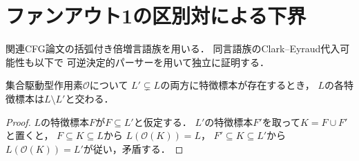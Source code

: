 \section{ファンアウト1の区別対による下界}
\label{app:fanout-one-lower}
関連CFG論文の括弧付き倍増言語族を用いる．
同言語族のClark--Eyraud代入可能性も以下で
可逆決定的パーサーを用いて独立に証明する．
\begin{lemma}[区別対]
\label{lem:distinguishing-pair}
集合駆動型作用素$\mathcal O$について
$L'\subsetneq L$の両方に特徴標本が存在するとき，
$L$の各特徴標本は$L\setminus L'$と交わる．
\end{lemma}
\begin{proof}
$L$の特徴標本$F$が$F\subseteq L'$と仮定する．
$L'$の特徴標本$F'$を取って$K=F\cup F'$と置くと，
$F\subseteq K\subseteq L$から
$L(\mathcal O(K))=L$，
$F'\subseteq K\subseteq L'$から
$L(\mathcal O(K))=L'$が従い，矛盾する．
\end{proof}

